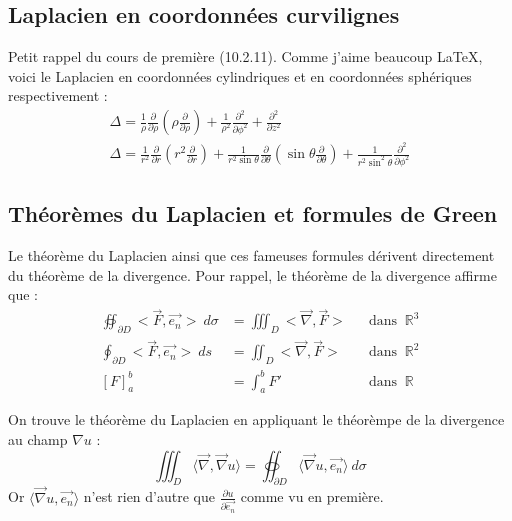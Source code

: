 \documentclass[british,french,11pt, a4paper, openany]{book}
\begin{document}
				\subsection{Laplacien en coordonnées curvilignes}
				Petit rappel du cours de première (10.2.11). Comme j'aime beaucoup \LaTeX, voici le Laplacien
				en coordonnées cylindriques et en coordonnées sphériques respectivement :
				\begin{eqnarray}
					\Delta = \frac{1}{\rho}\frac{\partial}{\partial\rho}\left(\rho\frac{\partial}{\partial\rho}\right)
					+\frac{1}{\rho^2}\frac{\partial^2}{\partial\phi^2}+ \frac{\partial^2}{\partial z^2}\\
					\Delta = \frac{1}{r^2}\frac{\partial}{\partial r}\left(r^2\frac{\partial}{\partial r}\right) +
					\frac{1}{r^2\sin\theta}\frac{\partial}{\partial\theta}\left(\sin\theta\frac{\partial}{\partial
						\theta}\right) + \frac{1}{r^2\sin^2\theta}\frac{\partial^2}{\partial\phi^2}
				\end{eqnarray}
																		
				\subsection{Théorèmes du Laplacien et formules de Green}
				Le théorème du Laplacien ainsi que ces fameuses formules dérivent directement du théorème de
				la divergence. Pour rappel, le théorème de la divergence affirme que :
				\begin{equation}
					\begin{array}{lll}
						\oiint_{\partial D} <\vec{F},\vec{e_n}>\ d\sigma & = \iiint_D <\vec{\nabla},\vec{F}> & \ \ \text{                    
						dans }\ \mathbb{R}^3\\
						\oint_{\partial D}  <\vec{F},\vec{e_n}>\ ds      & = \iint_D <\vec{\nabla},\vec{F}>  & \ \ \text{                    
						dans }\ \mathbb{R}^2\\
						\left[F\right]^b_a                               & = \int_a^b F'                     & \ \ \text{ dans }\ \mathbb{R} 
					\end{array}
				\end{equation}
																		
				On trouve le théorème du Laplacien en appliquant le théorèmpe de la divergence au champ 
				$\nabla u$ :
				\begin{equation}
					\iiint_D \langle\vec{\nabla},\vec{\nabla}u\rangle = \oiint_{\partial D} \langle\vec{\nabla}
					u, \vec{e_n}\rangle\ d\sigma
				\end{equation}
				Or $\langle\vec{\nabla}	u, \vec{e_n}\rangle$ n'est rien d'autre que $\frac{\partial u}{\partial
					\vec{e_n}}$ comme vu en première.\\
																		
\end{document}
